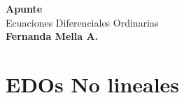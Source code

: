 \documentclass[letterpaper,12pt]{report}
\begin{document}
\begin{titlepage}
    
    \centering
    \vspace*{5cm}
    \Large \textbf{Apunte} \\ 
    \Huge Ecuaciones Diferenciales Ordinarias \\
    \vspace{0.2cm}
    \large \textbf{Fernanda Mella A.}  
\end{titlepage}

\tableofcontents

\chapter{EDOs No lineales}

\end{document}
